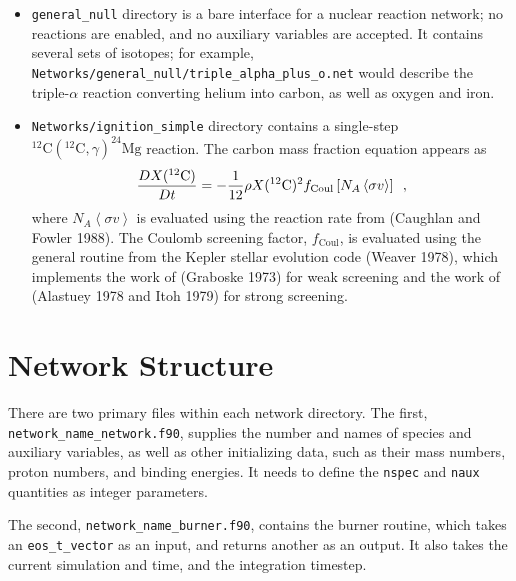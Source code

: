 \documentclass[11pt]{book}
\begin{document}
\begin{itemize}

\item {\tt general\_null} directory is a bare interface for a
  nuclear reaction network; no reactions are enabled, and no
  auxiliary variables are accepted. It contains several sets of
  isotopes; for example,
  {\tt Networks/general\_null/triple\_alpha\_plus\_o.net} would describe the
  triple-$\alpha$ reaction converting helium into carbon, as well as
  oxygen and iron.

\item {\tt Networks/ignition\_simple} directory contains a single-step
  $^{12}\mathrm{C}(^{12}\mathrm{C},\gamma)^{24}\mathrm{Mg}$ reaction.
  The carbon mass fraction equation appears as
\begin{equation}
\frac{D X(^{12}\mathrm{C})}{Dt} = - \frac{1}{12} \rho X(^{12}\mathrm{C})^2
    f_\mathrm{Coul} \left [N_A \left <\sigma v \right > \right]\enskip,
\end{equation}
where $N_A \left <\sigma v\right>$ is evaluated using the reaction
rate from (Caughlan and Fowler 1988).  The Coulomb screening factor,
$f_\mathrm{Coul}$, is evaluated using the general routine from the
Kepler stellar evolution code (Weaver 1978), which implements the work
of (Graboske 1973) for weak screening and the work of (Alastuey 1978
and Itoh 1979) for strong screening.

\end{itemize}

\section{Network Structure}

There are two primary files within each network directory. The first,
{\tt network\_name\_network.f90}, supplies the number and names of species and
auxiliary variables, as well as other initializing data, 
such as their mass numbers, proton numbers, and binding energies. It needs to 
define the {\tt nspec} and {\tt naux} quantities as integer parameters.

The second, {\tt network\_name\_burner.f90}, contains the burner routine, which takes
an {\tt eos\_t\_vector} as an input, and returns another as an output. It also takes 
the current simulation and time, and the integration timestep.
\end{document}
